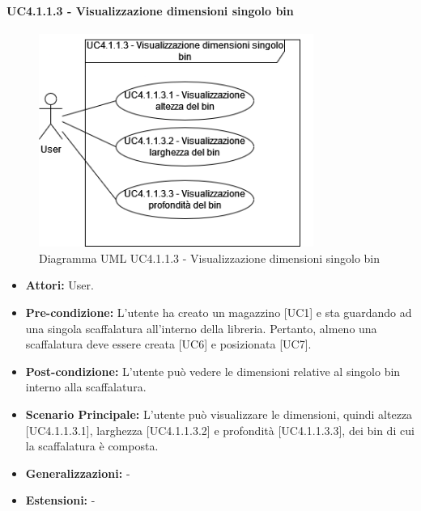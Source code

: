 \paragraph{UC4.1.1.3 - Visualizzazione dimensioni singolo bin}
\begin{figure}[H]
  \centering
  \includegraphics[width=0.8\textwidth]{UC_diagrams_1-10/UC4.1.1.3.drawio.png}
   \caption{Diagramma UML UC4.1.1.3 - Visualizzazione dimensioni singolo bin}
\end{figure}
\begin{itemize}
    \item \textbf{Attori:} User.
    \item \textbf{Pre-condizione:} L'utente ha creato un magazzino [UC1] e sta guardando ad una singola scaffalatura all'interno della libreria. Pertanto, almeno una scaffalatura deve essere creata [UC6] e posizionata [UC7].
    \item \textbf{Post-condizione:} L'utente può vedere le dimensioni relative al singolo bin interno alla scaffalatura.
    \item \textbf{Scenario Principale:} L'utente può visualizzare le dimensioni, quindi altezza [UC4.1.1.3.1], larghezza [UC4.1.1.3.2] e profondità [UC4.1.1.3.3], dei bin di cui la scaffalatura è composta.
    \item \textbf{Generalizzazioni:} -
    \item \textbf{Estensioni:} -
\end{itemize}

